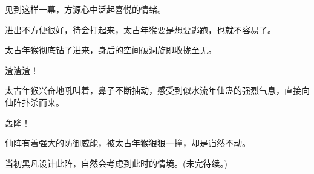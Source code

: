 \begin{this_body}
见到这样一幕，方源心中泛起喜悦的情绪。

进出不方便很好，待会打起来，太古年猴要是想要逃跑，也就不容易了。

太古年猴彻底钻了进来，身后的空间破洞旋即收拢至无。

渣渣渣！

太古年猴兴奋地吼叫着，鼻子不断抽动，感受到似水流年仙蛊的强烈气息，直接向仙阵扑杀而来。

轰隆！

仙阵有着强大的防御威能，被太古年猴狠狠一撞，却是岿然不动。

当初黑凡设计此阵，自然会考虑到此时的情境。(未完待续。)

\end{this_body}


